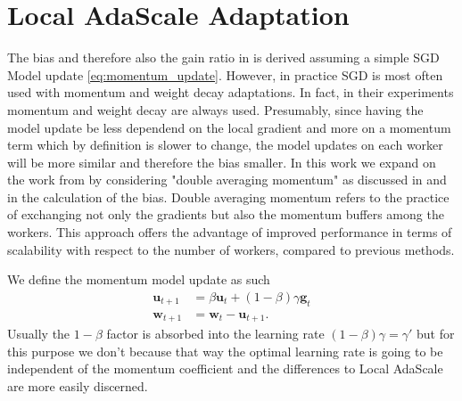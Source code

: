 \documentclass[10pt,twocolumn,letterpaper]{article}
\begin{document}
\section{Local AdaScale Adaptation}
The bias and therefore also the gain ratio in \cite{BALLES2024P} is derived assuming a simple SGD Model update \ref{eq:momentum_update}. However, in practice SGD is most often used with momentum and weight decay adaptations. In fact, in their experiments \cite{BALLES2024P} momentum and weight decay are always used. Presumably, since having the model update be less dependend on the local gradient and more on a momentum term which by definition is slower to change, the model updates on each worker will be more similar and therefore the bias smaller. In this work we expand on the work from \cite{BALLES2024P} by considering "double averaging momentum" as discussed in \cite{wang2020slowmoimprovingcommunicationefficientdistributed} and \cite{yu2019linearspeedupanalysiscommunication} in the calculation of the bias.
Double averaging momentum refers to the practice of exchanging not only the gradients but also the momentum buffers among the workers. This approach offers the advantage of improved performance in terms of scalability with respect to the number of workers, compared to previous methods.

We define the momentum model update as such
\begin{align}\label{eq:momentum_update}
    \mathbf{u}_{t+1} &= \beta \mathbf{u}_t + (1-\beta)\gamma \mathbf{g}_t \\
    \mathbf{w}_{t+1} &= \mathbf{w}_t - \mathbf{u}_{t+1}.
\end{align}
Usually the $1-\beta$ factor is absorbed into the learning rate $(1-\beta)\gamma = \gamma'$ but for this purpose we don't because that way the optimal learning rate is going to be independent of the momentum coefficient and the differences to Local AdaScale are more easily discerned.
\end{document}

